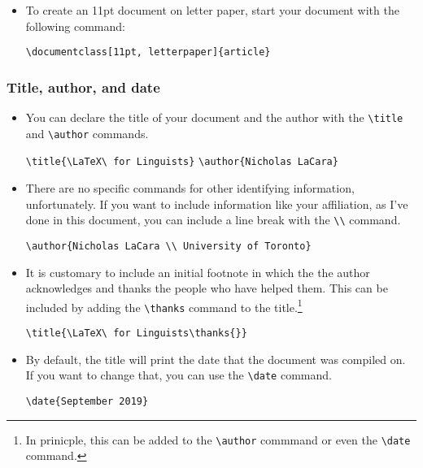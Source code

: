 \documentclass[11pt, letterpaper]{article}
\begin{document}
\begin{itemize}
\begin{exe}
	\end{exe}

      \item To create an 11pt document on letter paper, start your document with the following command:
      
	\begin{exe}
	  \ex \verb!\documentclass[11pt, letterpaper]{article}! 
	\end{exe}

	
    \end{itemize}

  \subsubsection{Title, author, and date}
  
    \begin{itemize}
      \item You can declare the title of your document and the author with the \verb|\title| and \verb|\author| commands.
      
	  \begin{exe}
	    \ex \verb|\title{\LaTeX\ for Linguists}|
	    \ex \verb|\author{Nicholas LaCara}|
	  \end{exe}
	
      \item There are no specific commands for other identifying information, unfortunately. If you want to include information like your affiliation, as I've done in this document, you can include a line break with the \verb|\\| command.
      
	  \begin{exe}
	    \ex \verb|\author{Nicholas LaCara \\ University of Toronto}|
	  \end{exe}
	  
	\item It is customary to include an initial footnote in which the the author acknowledges and thanks the people who have helped them. This can be included by adding the \verb|\thanks| command to the title.\footnote{In prinicple, this can be added to the \texttt{\textbackslash author} commmand or even the \texttt{\textbackslash date} command.}%
	
	  \begin{exe}
	    \ex \verb|\title{\LaTeX\ for Linguists\thanks{}}|
	  \end{exe}


      \item By default, the title will print the date that the document was compiled on. If you want to change that, you can use the \verb|\date| command.
      
	  \begin{exe}
	    \ex \verb|\date{September 2019}|
	  \end{exe}

      
    \end{itemize}
\end{document}
